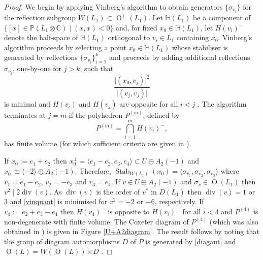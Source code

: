 \documentclass[12pt, a4paper]{article}
\newcommand{\CC}{\mathbb{C}}
\newcommand{\PP}{\mathbb{P}}
\newcommand{\HH}{\mathbb{H}}
\newcommand{\la}{\langle}
\newcommand{\ra}{\rangle}
\newcommand{\opn}{\operatorname}
\newcommand{\op}{\oplus}
\begin{document}
\begin{proof}
  We begin by applying Vinberg's algorithm \cite{Vinberg} to obtain generators $\{\sigma_{v_i} \}$ for the reflection subgroup $W(L_1) \subset \opn{O}^+(L_1)$.
  Let $\HH(L_1)$ be a component of $\{[x] \in \PP(L_1 \otimes \CC) \mid (x,x)<0 \}$ and, for fixed $x_0 \in \HH(L_1)$, let $H(v_i)^-$ denote the half-space of $\HH(L_1)$ orthogonal to $v_i \in L_1$ containing $x_0$.
  Vinberg's algorithm proceeds by selecting a point $x_0 \in \HH(L_1)$ whose stabiliser is generated by reflections $\{\sigma_{v_i} \}_{i=1}^k$ and proceeds by adding additional reflections $\sigma_{v_j}$, one-by-one for $j>k$, such that  
\begin{equation}\label{vinquant}
  \frac{\vert (x_0, v_j) \vert^2}{\vert (v_j, v_j) \vert}
\end{equation}
is minimal and $H(v_i)$ and $H(v_j)$ are opposite for all $i<j$ \cite[p.327]{Vinberg}.
The algorithm terminates at $j=m$ if the polyhedron $P^{(m)}$, defined by
\begin{equation*}
  P^{(m)} = \bigcap_{i=1}^m H(v_i)^-,
\end{equation*}
has finite volume (for which sufficient criteria are given in \cite{Vinberg}).

If $x_0 := e_1 + e_2$ then 
$x_0^{\perp} = \la e_1 - e_2, e_3, e_4 \ra \subset U \op A_2(-1)$
and  $x_0^{\perp} \cong \la -2 \ra \op A_2(-1)$.
Therefore, $\opn{Stab}_{W(L_1)}(x_0) = \la \sigma_{v_1}, \sigma_{v_2}, \sigma_{v_3} \ra$ where
$v_1 = e_1 - e_2$,
$v_2 = -e_3$
and $v_3 = e_4$.
If $v \in U \op A_2(-1)$ and $\sigma_v \in \opn{O}(L_1)$ then $v^2 \mid 2 \opn{div}(v)$.
As $\opn{div}(v)$ is the order of $v^*$ in $D(L_1)$ then $\opn{div}(v) = 1$ or $3$ and 
\eqref{vinquant} is minimised for $v^2 = -2$ or $-6$, respectively.
If $v_4 := e_2 + e_3 - e_4$ then $H(v_4)^-$ is opposite to $H(v_i)^-$ for all $i<4$ and $P^{(4)}$ is non-degenerate with finite volume.
The Coxeter diagram of $P^{(4)}$ (which was also obtained in  \cite{VinbergReflection}) is given in Figure \ref{U+A2diagram}.
The result follows by noting that the group of diagram automorphisms $D$ of $P$ is generated by \eqref{diagaut} and $\opn{O}(L) = W(\opn{O}(L)) \rtimes D$ \cite{Vinberg}. 
\end{proof}
\end{document}
